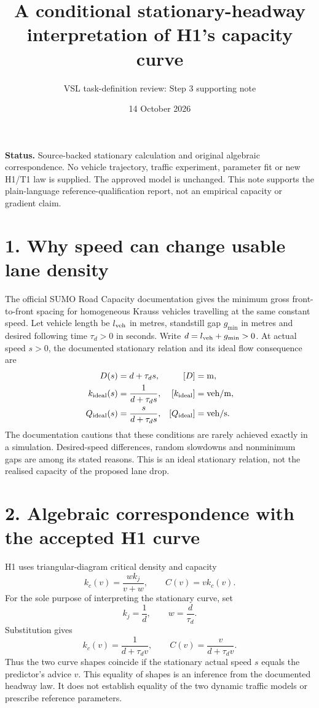 \documentclass[11pt,a4paper]{article}
\title{A conditional stationary-headway interpretation of H1's capacity curve}
\author{VSL task-definition review: Step 3 supporting note}
\date{14 October 2026}
\begin{document}
\maketitle

\textbf{Status.} Source-backed stationary calculation and original algebraic
correspondence. No vehicle trajectory, traffic experiment, parameter fit or
new H1/T1 law is supplied. The approved model is unchanged. This note supports
the plain-language reference-qualification report, not an empirical capacity
or gradient claim.

\section*{1. Why speed can change usable lane density}

The official SUMO Road Capacity documentation gives the minimum gross
front-to-front spacing for homogeneous Krauss vehicles travelling at the
same constant speed. Let vehicle length be $l_{\rm veh}$ in metres,
standstill gap $g_{\min}$ in metres and desired following time $\tau_d>0$
in seconds. Write $d=l_{\rm veh}+g_{\min}>0$. At actual speed $s>0$,
the documented stationary relation and its ideal flow consequence are
\begin{align}
 D(s)&=d+\tau_d s, & [D]&={\rm m},\\
 k_{\rm ideal}(s)&=\frac{1}{d+\tau_d s},
 & [k_{\rm ideal}]&={\rm veh/m},\\
 Q_{\rm ideal}(s)&=\frac{s}{d+\tau_d s},
 & [Q_{\rm ideal}]&={\rm veh/s}.
\end{align}
The documentation cautions that these conditions are rarely achieved
exactly in a simulation. Desired-speed differences, random slowdowns and
nonminimum gaps are among its stated reasons. This is an ideal stationary
relation, not the realised capacity of the proposed lane drop.

\section*{2. Algebraic correspondence with the accepted H1 curve}

H1 uses triangular-diagram critical density and capacity
\begin{equation}
 k_c(v)=\frac{w k_j}{v+w},\qquad C(v)=v k_c(v).
\end{equation}
For the sole purpose of interpreting the stationary curve, set
\begin{equation}
 k_j=\frac{1}{d},\qquad w=\frac{d}{\tau_d}.
\end{equation}
Substitution gives
\begin{equation}
 k_c(v)=\frac{1}{d+\tau_d v},\qquad
 C(v)=\frac{v}{d+\tau_d v}.
\end{equation}
Thus the two curve shapes coincide if the stationary actual speed $s$
equals the predictor's advice $v$. This equality of shapes is an inference
from the documented headway law. It does not establish equality of the two
dynamic traffic models or prescribe reference parameters.
\end{document}
